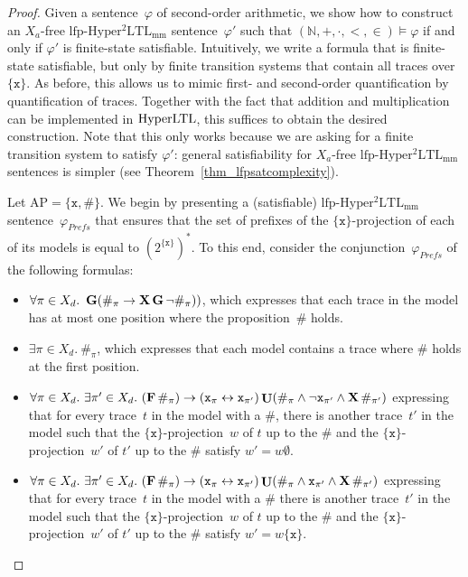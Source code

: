 \documentclass[dvipsnames,10pt,a4paper]{amsart}
\theoremstyle{definition}
\theoremstyle{remark}
\newcommand{\nats}{\mathbb{N}}
\renewcommand{\phi}{\varphi}
\newcommand{\pow}[1]{2^{#1}}
\newcommand{\set}[1]{\{#1\}}
\newcommand{\F}{\mathop{\mathbf{F}\vphantom{a}}\nolimits}
\newcommand{\G}{\mathop{\mathbf{G}\vphantom{a}}\nolimits}
\DeclareMathOperator{\U}{\mathbf{U}}
\newcommand{\X}{\mathop{\mathbf{X}\vphantom{a}}\nolimits}
\newcommand{\hyltl}{\mathrm{Hyper\-LTL}\xspace}
\newcommand{\lfpsohyltlfp}{\mathrm{lfp\text{-}{Hyper^2LTL_{\mathrm{mm}}}}\xspace}
\newcommand{\ap}[0]{\mathrm{AP}}
\newcommand{\univar}{X_a}
\newcommand{\unidisvar}{X_d}
\newcommand{\inprop}{\mathtt{x}}
\newcommand{\prefs}{\mathit{Prefs}}
\newcommand{\natsstruct}{(\nats, +, \cdot, <, \in)}
\begin{document}
\begin{proof}
Given a sentence~$\phi$ of second-order arithmetic, we show how to construct an $\univar$-free $\lfpsohyltlfp$ sentence~$\phi'$ such that  $\natsstruct\models\phi$ if and only if $\phi'$ is finite-state satisfiable.
Intuitively, we write a formula that is finite-state satisfiable, but only by finite transition systems that contain all traces over $\set{\inprop}$.
As before, this allows us to mimic first- and second-order quantification by quantification of traces.
Together with the fact that addition and multiplication can be implemented in $\hyltl$, this suffices to obtain the desired construction.
Note that this only works because we are asking for a finite transition system to satisfy $\phi'$: general satisfiability for $\univar$-free $\lfpsohyltlfp$ sentences is simpler (see Theorem~\ref{thm_lfpsatcomplexity}).

Let $\ap = \set{\inprop,\#}$.
We begin by presenting a (satisfiable) $\lfpsohyltlfp$ sentence~$\phi_\prefs$ that ensures that the set of prefixes of the $\set{\inprop}$-projection of each of its models is equal to $(\pow{\set{\inprop}})^*$.
To this end, consider the conjunction~$\phi_\prefs$ of the following formulas:
\begin{itemize}
    \item $\forall \pi \in \unidisvar.\ \G(\#_\pi \rightarrow \X\G\neg \#_\pi))$, which expresses that each trace in the model has at most one position where the proposition~$\#$ holds.
    \item $\exists \pi \in \unidisvar.\  \#_{\pi}$, which expresses that each model contains a trace where $\#$ holds at the first position.
    \item $\forall \pi \in \unidisvar.\ \exists \pi' \in \unidisvar.\ (\F\#_\pi) \rightarrow (\inprop_\pi \leftrightarrow \inprop_{\pi'}) \U (\#_{\pi} \wedge \neg\inprop_{\pi'} \wedge \X\#_{\pi'} )$ expressing that for every trace~$t$ in the model with a $\#$, there is another trace~$t'$ in the model such that the $\set{\inprop}$-projection~$w$ of $t$ up to the $\#$ and the $\set{\inprop}$-projection~$w'$ of $t'$ up to the $\#$ satisfy $w' = w\emptyset$.
    \item $\forall \pi \in \unidisvar.\ \exists \pi' \in \unidisvar.\ (\F\#_\pi)\rightarrow (\inprop_\pi \leftrightarrow \inprop_{\pi'}) \U (\#_{\pi} \wedge \inprop_{\pi'} \wedge \X\#_{\pi'} )$ expressing that for every trace~$t$ in the model with a $\#$ there is another trace~$t'$ in the model such that the $\set{\inprop}$-projection~$w$ of $t$ up to the $\#$ and the $\set{\inprop}$-projection~$w'$ of $t'$ up to the $\#$ satisfy $w' = w\set{\inprop}$.   
\end{itemize}


\end{proof}
\end{document}
